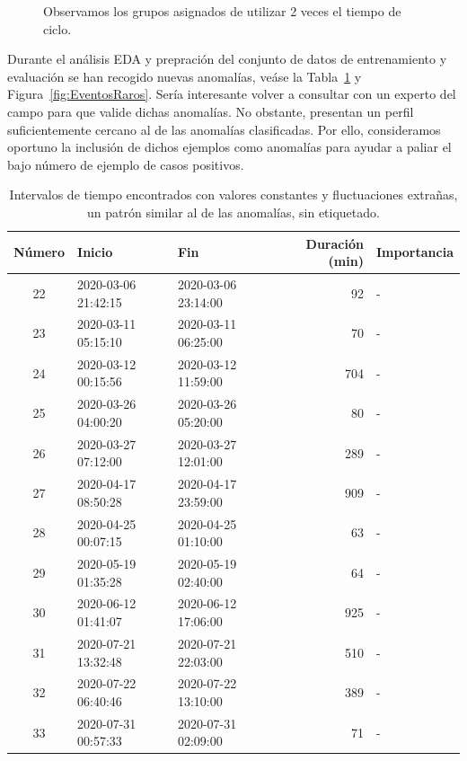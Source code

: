 \documentclass[12pt,letterpaper]{article}
\begin{document}
\begin{figure}[!ht]
        \centering
        \caption{Observamos los grupos asignados de utilizar 2 veces el tiempo de ciclo.}
        \label{fig:VentanaDeslizante}
\end{figure}


Durante el análisis EDA y prepración del conjunto de datos de entrenamiento y evaluación se han recogido nuevas anomalías, veáse la Tabla~\ref{tab:EventosRaros} y Figura~\ref{fig:EventosRaros}.
Sería interesante volver a consultar con un experto del campo para que valide dichas anomalías. No obstante, presentan un perfil suficientemente cercano al de las anomalías clasificadas.
Por ello, consideramos oportuno la inclusión de dichos ejemplos como anomalías para ayudar a paliar el bajo número de ejemplo de casos positivos.

\begin{table}[!ht]
    \centering
    \begin{tabular}{|c|l|l|r|l|}
    \hline
    \textbf{Número} & \textbf{Inicio}       & \textbf{Fin}         & \textbf{Duración (min)} & \textbf{Importancia} \\ \hline
    22 & 2020-03-06 21:42:15 & 2020-03-06 23:14:00 & 92 & - \\ \hline
    23 & 2020-03-11 05:15:10 & 2020-03-11 06:25:00 & 70 & - \\ \hline
    24 & 2020-03-12 00:15:56 & 2020-03-12 11:59:00 & 704 & - \\ \hline
    25 & 2020-03-26 04:00:20 & 2020-03-26 05:20:00 & 80 & - \\ \hline
    26 & 2020-03-27 07:12:00 & 2020-03-27 12:01:00 & 289 & - \\ \hline
    27 & 2020-04-17 08:50:28 & 2020-04-17 23:59:00 & 909 & - \\ \hline
    28 & 2020-04-25 00:07:15 & 2020-04-25 01:10:00 & 63 & - \\ \hline
    29 & 2020-05-19 01:35:28 & 2020-05-19 02:40:00 & 64 & - \\ \hline
    30 & 2020-06-12 01:41:07 & 2020-06-12 17:06:00 & 925 & - \\ \hline
    31 & 2020-07-21 13:32:48 & 2020-07-21 22:03:00 & 510 & - \\ \hline
    32 & 2020-07-22 06:40:46 & 2020-07-22 13:10:00 & 389 & - \\ \hline
    33 & 2020-07-31 00:57:33 & 2020-07-31 02:09:00 & 71 & - \\ \hline
    \end{tabular}
    \caption{Intervalos de tiempo encontrados con valores constantes y fluctuaciones extrañas, un patrón similar al de las anomalías, sin etiquetado.}
    \label{tab:EventosRaros}
\end{table}
\end{document}
